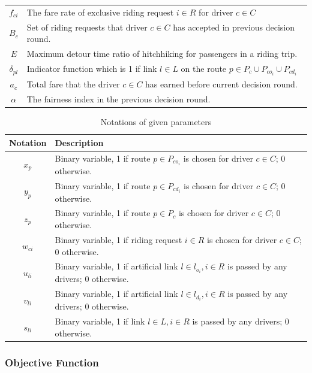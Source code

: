 \begin{longtable}{cp{14cm}}
    $f_{ci}$ & The fare rate of exclusive riding request $i \in R$ for driver $c \in C$ \\
    $B_c$ & Set of riding requests that driver $c \in C$ has accepted in previous decision round. \\
    $E$ & Maximum detour time ratio of hitchhiking for passengers in a riding trip. \\
    $\delta_{pl}$ & Indicator function which is 1 if link $l \in L$ on the route $p \in P_c \cup P_{co_i} \cup P_{cd_i}$ \\
    $a_c$ & Total fare that the driver $c \in C$ has earned before current decision round. \\
    $\alpha$ & The fairness index in the previous decision round. \\
  \bottomrule
\end{longtable}  
\par

\begin{longtable}{cl}
  \caption{Notations of given parameters}\\
  \toprule
  \multicolumn{1}{l}{Notation}&
  \multicolumn{1}{l}{Description}\\
  \midrule
  \endhead
    $x_{p}$ & Binary variable, 1 if route $p \in P_{co_i}$ is chosen for driver $c \in C$; 0 otherwise. \\
    $y_{p}$ & Binary variable, 1 if route $p \in P_{cd_i}$ is chosen for driver $c \in C$; 0 otherwise. \\
    $z_{p}$ & Binary variable, 1 if route $p \in P_c$ is chosen for driver $c \in C$; 0 otherwise. \\
    $w_{ci}$ & Binary variable, 1 if riding request $i \in R$ is chosen for driver $c \in C$; 0 otherwise. \\
    $u_{li}$ & Binary variable, 1 if artificial link $l \in l_{o_i}, i \in R$ is passed by any drivers; 0 otherwise. \\
    $v_{li}$ & Binary variable, 1 if artificial link $l \in l_{d_i}, i \in R$ is passed by any drivers; 0 otherwise. \\
    $s_{li}$ & Binary variable, 1 if link $l \in L, i \in R$ is passed by any drivers; 0 otherwise. \\
  \bottomrule
\end{longtable}  
\newpage

\subsubsection*{Objective Function}

